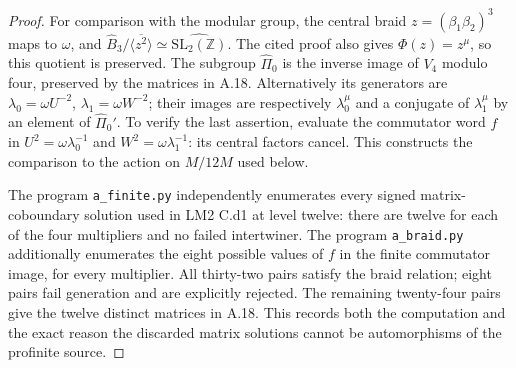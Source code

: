 \begin{proof}
For comparison with the modular group, the central braid
$z=(\beta_1\beta_2)^3$ maps to $\omega$, and
$\widehat B_3/\overline{\langle z^2\rangle}
\simeq\widehat{\mathrm{SL}_2(\mathbb Z)}$.
The cited proof also gives $\Phi(z)=z^\mu$, so this quotient is
preserved. The subgroup $\widehat\Pi_0$ is the inverse image of
$V_4$ modulo four, preserved by the matrices in A.18.
Alternatively its generators are
$\lambda_0=\omega U^{-2}$, $\lambda_1=\omega W^{-2}$; their images
are respectively $\lambda_0^\mu$ and a conjugate of
$\lambda_1^\mu$ by an element of $\widehat\Pi_0'$. To verify the
last assertion, evaluate the commutator word $f$ in
$U^2=\omega\lambda_0^{-1}$ and
$W^2=\omega\lambda_1^{-1}$: its central factors cancel. This
constructs the comparison to the action on $M/12M$ used below.

The program \texttt{a\_finite.py} independently enumerates every
signed matrix-coboundary solution used in LM2 C.d1 at level twelve:
there are twelve for each of the four multipliers and no failed
intertwiner. The program \texttt{a\_braid.py} additionally
enumerates the eight possible values of $f$ in the finite
commutator image, for every multiplier. All thirty-two pairs
satisfy the braid relation; eight pairs fail generation and are
explicitly rejected. The remaining twenty-four pairs give the
twelve distinct matrices in A.18. This records both the computation
and the exact reason the discarded matrix solutions cannot be
automorphisms of the profinite source.
\end{proof}

